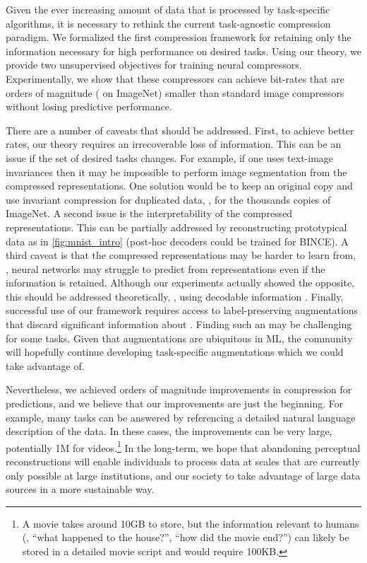 \documentclass[final]{article}
\begin{document}
Given the ever increasing amount of data that is processed by task-specific algorithms, it is necessary to rethink the current task-agnostic compression paradigm.
We formalized the first compression framework for retaining only the information necessary for high performance on desired tasks. 
Using our theory, we provide two unsupervised objectives for training neural compressors.
Experimentally, we show that these compressors can achieve  bit-rates that are orders of magnitude ( on ImageNet) smaller than standard image compressors without losing predictive performance.

There are a number of caveats that should be addressed. 
First, to achieve better rates, our theory requires an irrecoverable loss of information. This can be an issue if the set of desired tasks changes.
For example, if one uses text-image invariances then it may be impossible to perform image segmentation from the compressed representations.
One solution would be to keep an original copy and use invariant compression for duplicated data, \eg, for the thousands copies of ImageNet.
A second issue is the interpretability of the compressed representations.
This can be partially addressed by reconstructing prototypical data as in \cref{fig:mnist_intro} (post-hoc decoders could be trained for BINCE).
A third caveat is that the compressed representations may be harder to learn from, \eg, neural networks may struggle to predict from representations even if the information is retained.
Although our experiments actually showed the opposite, this should be addressed theoretically, \eg, using decodable information \cite{xu_theory_2020,dubois_learning_2020}.
Finally, successful use of our framework requires access to label-preserving augmentations  that discard significant information about . 
Finding such an  may be challenging for some tasks.
Given that augmentations are ubiquitous in ML, the community will hopefully continue developing task-specific augmentations which we could take advantage of.

Nevertheless, we achieved orders of magnitude improvements in compression for predictions, and we believe that our improvements are just the beginning.
For example, many tasks can be answered by referencing a detailed natural language description of the data. In these cases, the improvements can be very large, potentially 1M for videos.\footnote{A movie takes around 10GB to store, but the information relevant to humans (\eg, ``what happened to the house?'', ``how did the movie end?'') can likely be stored in a detailed movie script and would require 100KB.}
In the long-term, we hope that abandoning perceptual reconstructions will enable individuals to process data at scales that are currently only possible at large institutions, and our society to take advantage of large data sources in a more sustainable way.  
\clearpage
\newpage
\end{document}
